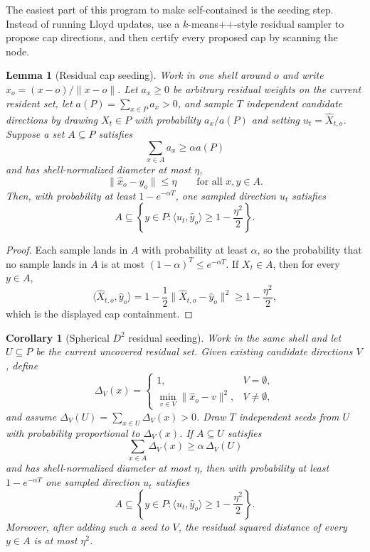 \documentclass[10pt]{article}
\newtheorem{lemma}[theorem]{Lemma}
\newtheorem{corollary}[theorem]{Corollary}
\theoremstyle{definition}
\begin{document}
The easiest part of this program to make self-contained is the seeding step.
Instead of running Lloyd updates, use a $k$-means++-style residual sampler to
propose cap directions, and then certify every proposed cap by scanning the
node.

\begin{lemma}[Residual cap seeding]\label{lem:residual-cap-seeding}
   Work in one shell around $o$ and write
   $\widehat x_o=(x-o)/\|x-o\|$.  Let $a_x\ge0$ be arbitrary residual weights
   on the current resident set, let $a(P)=\sum_{x\in P}a_x>0$, and sample
   $T$ independent candidate directions by drawing $X_t\in P$ with probability
   $a_x/a(P)$ and setting $u_t=\widehat X_{t,o}$.  Suppose a set
   $A\subseteq P$ satisfies
   \[
      \sum_{x\in A}a_x\ge \alpha a(P)
   \]
   and has shell-normalized diameter at most $\eta$,
   \[
      \|\widehat x_o-\widehat y_o\|\le\eta
      \qquad\text{for all }x,y\in A .
   \]
   Then, with probability at least $1-e^{-\alpha T}$, one sampled direction
   $u_t$ satisfies
   \[
      A\subseteq
      \left\{
         y\in P:\langle u_t,\widehat y_o\rangle\ge1-\frac{\eta^2}{2}
      \right\}.
   \]
\end{lemma}

\begin{proof}
   Each sample lands in $A$ with probability at least $\alpha$, so the
   probability that no sample lands in $A$ is at most
   $(1-\alpha)^T\le e^{-\alpha T}$.  If $X_t\in A$, then for every $y\in A$,
   \[
      \langle \widehat X_{t,o},\widehat y_o\rangle
      =
      1-\frac12\|\widehat X_{t,o}-\widehat y_o\|^2
      \ge
      1-\frac{\eta^2}{2},
   \]
   which is the displayed cap containment.
\end{proof}

\begin{corollary}[Spherical \(D^2\) residual seeding]
   \label{cor:spherical-d2-seeding}
   Work in the same shell and let $U\subseteq P$ be the current uncovered
   residual set.  Given existing candidate directions $V$, define
   \[
      \Delta_V(x)=
      \begin{cases}
         1, & V=\emptyset,\\
         \min_{v\in V}\|\widehat x_o-v\|^2, & V\ne\emptyset,
      \end{cases}
   \]
   and assume $\Delta_V(U)=\sum_{x\in U}\Delta_V(x)>0$.  Draw $T$ independent
   seeds from $U$ with probability proportional to $\Delta_V(x)$.  If
   $A\subseteq U$ satisfies
   \[
      \sum_{x\in A}\Delta_V(x)\ge\alpha\,\Delta_V(U)
   \]
   and has shell-normalized diameter at most $\eta$, then with probability at
   least $1-e^{-\alpha T}$ one sampled direction $u_t$ satisfies
   \[
      A\subseteq
      \left\{
         y\in P:\langle u_t,\widehat y_o\rangle\ge1-\frac{\eta^2}{2}
      \right\}.
   \]
   Moreover, after adding such a seed to $V$, the residual squared distance of
   every $y\in A$ is at most $\eta^2$.
\end{corollary}
\end{document}
